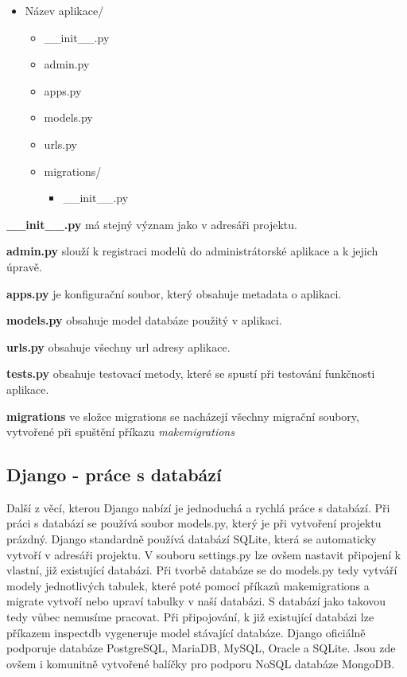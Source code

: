 \begin{itemize}
	\item \lbrack Název aplikace\rbrack /
 	\begin{itemize}
 		\item \_\_init\_\_.py
		\item admin.py
		\item apps.py
		\item models.py
		\item urls.py
		\item \lbrack migrations\rbrack /
		\begin{itemize}
			\item \_\_init\_\_.py
		\end{itemize}
	\end{itemize}
\end{itemize}

\vspace{9px}

\textbf{\_\_init\_\_.py} má stejný význam jako v adresáři projektu. 
\vspace{6px}

\textbf{admin.py} slouží k registraci modelů do administrátorské
aplikace a k jejich úpravě.  \vspace{6px}

\textbf{apps.py} je konfigurační soubor, který obsahuje metadata o 
aplikaci.
\vspace{6px}

\textbf{models.py} obsahuje model databáze použitý v aplikaci.
\vspace{6px}

\textbf{urls.py} obsahuje všechny url adresy aplikace.
\vspace{6px}

\textbf{tests.py} obsahuje testovací metody, které se spustí při
testování funkčnosti aplikace.
\vspace{6px}

\textbf{migrations} ve složce migrations se nacházejí všechny migrační
soubory, vytvořené při spuštění příkazu \textit{makemigrations}

\newpage

\subsection{Django - práce s databází}


Další z věcí, kterou Django nabízí je jednoduchá a rychlá
práce s databází. Při práci s databází se používá soubor models.py,
který je při vytvoření projektu prázdný. Django standardně používá
databází SQLite, která se automaticky vytvoří v adresáři projektu. V
souboru settings.py lze ovšem nastavit připojení k vlastní, již
existující databázi. Při tvorbě databáze se do models.py tedy vytváří
modely jednotlivých tabulek, které poté pomocí příkazů makemigrations
a migrate vytvoří nebo upraví tabulky v naší databázi. S databází jako
takovou tedy vůbec nemusíme pracovat. Při připojování, k již
existující databázi lze příkazem inspectdb vygeneruje model stávající
databáze. Django oficiálně podporuje databáze PostgreSQL, MariaDB,
MySQL, Oracle a SQLite. Jsou zde ovšem i komunitně vytvořené balíčky
pro podporu NoSQL databáze MongoDB. \cite{django}

